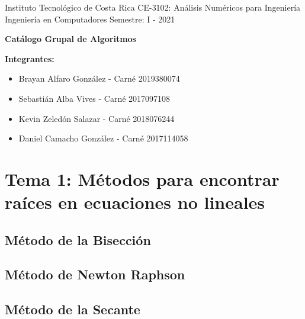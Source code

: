 \documentclass[10pt]{article}
\begin{document}
Instituto Tecnológico de Costa Rica \hfill
CE-3102: Análisis Numéricos para Ingeniería\\
Ingeniería en Computadores \hfill 
Semestre: I - 2021\\




\begin{center}\textbf{\huge Catálogo Grupal de Algoritmos}  \end{center}

{\bf Integrantes: }
\begin{itemize}
\item Brayan Alfaro González - Carné 2019380074
\item Sebastián Alba Vives - Carné 2017097108 
\item Kevin Zeledón Salazar - Carné 2018076244 
\item Daniel Camacho González - Carné 2017114058
\end{itemize}


\section{Tema 1: Métodos para encontrar raíces en ecuaciones no lineales}

\subsection{Método de la Bisección}



\newpage

\subsection{Método de Newton Raphson}



\newpage

\subsection{Método de la Secante}
\end{document}
